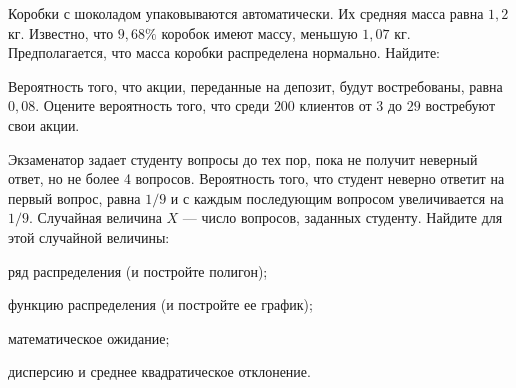 \vfil

\begin{zkrPlain}{25}\noindent 
	Коробки с шоколадом упаковываются автоматически. Их средняя масса равна $1{,}2$ кг. Известно, что $9{,}68\%$ коробок имеют массу, меньшую $1{,}07$ кг. Предполагается, что масса коробки распределена нормально. Найдите: \par {}
 
\end{zkrPlain}

\vfil

\begin{zkrPlain}{25}\noindent 
	Вероятность того, что акции, переданные на депозит, будут востребованы, равна $ 0{,}08 $. Оцените вероятность того, что среди $ 200 $ клиентов от $ 3 $ до $ 29 $ востребуют свои акции.
 
\end{zkrPlain}

\newpage\setcounter{zad}{0}\setcounter{footnote}{0}



\begin{zkrPlain}{25}\noindent 
	Экзаменатор задает студенту вопросы до тех пор, пока не получит неверный ответ, но не более 4 вопросов. Вероятность того, что студент неверно ответит на первый вопрос, равна $1/9$ и с каждым последующим вопросом увеличивается на $1/9$. Случайная величина $X$ --- число вопросов, заданных студенту.  Найдите для этой случайной величины: \par \smallskip\small{ \par \zz ряд распределения (и постройте полигон); \par \zz функцию распределения (и постройте ее график); \par \zz математическое ожидание; \par \zz дисперсию и среднее квадратическое отклонение.\par \par}
 
\end{zkrPlain}

\vfil

